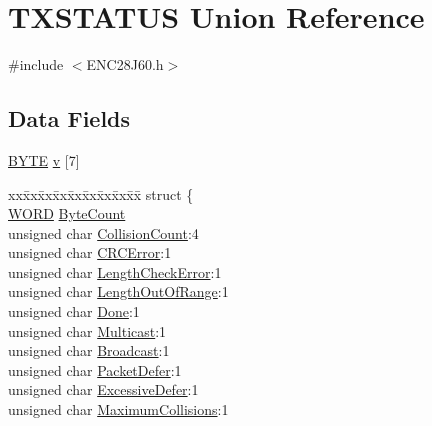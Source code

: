 \hypertarget{union_t_x_s_t_a_t_u_s}{}\section{T\+X\+S\+T\+A\+T\+U\+S Union Reference}
\label{union_t_x_s_t_a_t_u_s}


{\ttfamily \#include $<$E\+N\+C28\+J60.\+h$>$}

\subsection*{Data Fields}
\begin{DoxyCompactItemize}
\item 
\hyperlink{_generic_type_defs_8h_a4ae1dab0fb4b072a66584546209e7d58}{B\+Y\+T\+E} \hyperlink{union_t_x_s_t_a_t_u_s_ab360d67f1123be408cf61c449299a8b9}{v} \mbox{[}7\mbox{]}
\item 
\begin{tabbing}
xx\=xx\=xx\=xx\=xx\=xx\=xx\=xx\=xx\=\kill
struct \{\\
\>\hyperlink{_generic_type_defs_8h_a2b0e863dadf920709ec53d9088ee7c91}{WORD} \hyperlink{union_t_x_s_t_a_t_u_s_a27fd548a7b630a21bbd9a0760290ef93}{ByteCount}\\
\>unsigned char \hyperlink{union_t_x_s_t_a_t_u_s_a859eaa4b288d0adc251d379fcd16be67}{CollisionCount}:4\\
\>unsigned char \hyperlink{union_t_x_s_t_a_t_u_s_a4eb22bd1c361b173b9a70fd9f1a0f1e4}{CRCError}:1\\
\>unsigned char \hyperlink{union_t_x_s_t_a_t_u_s_a6100c4d76ea1b4110a4e6efffa431e65}{LengthCheckError}:1\\
\>unsigned char \hyperlink{union_t_x_s_t_a_t_u_s_a390dd13a1eb0ef079f6dd40e0f12759e}{LengthOutOfRange}:1\\
\>unsigned char \hyperlink{union_t_x_s_t_a_t_u_s_a148cf5e7845fc2154b6d1d79d272a568}{Done}:1\\
\>unsigned char \hyperlink{union_t_x_s_t_a_t_u_s_af1db8263c2237487c1065633cf2cc925}{Multicast}:1\\
\>unsigned char \hyperlink{union_t_x_s_t_a_t_u_s_a1ab2c1917fd96c609563e0f962521c1f}{Broadcast}:1\\
\>unsigned char \hyperlink{union_t_x_s_t_a_t_u_s_aff506930595282ba024813cef4159e04}{PacketDefer}:1\\
\>unsigned char \hyperlink{union_t_x_s_t_a_t_u_s_a7f17a3642708ce521524037401df04a4}{ExcessiveDefer}:1\\
\>unsigned char \hyperlink{union_t_x_s_t_a_t_u_s_ab7d8a02ccf8756430facd06138a89206}{MaximumCollisions}:1\\

\end{tabbing}
\end{DoxyCompactItemize}
